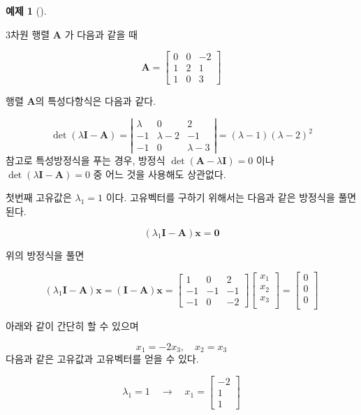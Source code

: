 \documentclass[
  11pt,
  a4paper,
  oneside]{scrbook}
\theoremstyle{definition}
\newtheorem{exercise}{예제}[chapter]
\theoremstyle{plain}
\theoremstyle{definition}
\theoremstyle{definition}
\theoremstyle{remark}
\begin{document}
\begin{exercise}[]\protect\hypertarget{exr-Example-20-1}{}\label{exr-Example-20-1}

3차원 행렬 \(\pmb A\) 가 다음과 같을 때

\[\pmb A=\left[\begin{array}{ccc}0 & 0 & -2 \\ 1 & 2 & 1 \\ 1 & 0 & 3\end{array}\right]\]

행렬 \(\pmb A\)의 특성다항식은 다음과 같다.

\[
\operatorname{det}(\lambda \pmb I -\pmb A)= 
\left|\begin{array}{ccc}
\lambda & 0 & 2 \\
-1 & \lambda-2 & -1 \\
-1 & 0 & \lambda-3
\end{array}\right|=(\lambda-1)(\lambda-2)^2
\] 참고로 특성방정식을 푸는 경우, 방정식
\(\operatorname{det}(\pmb A - \lambda \pmb I)=0\) 이나
\(\operatorname{det}(\lambda \pmb I -\pmb A)= 0\) 중 어느 것을 사용해도
상관없다.

첫번째 고유값은 \(\lambda_1=1\) 이다. 고유벡터를 구하기 위해서는 다음과
같은 방정식을 풀면 된다.

\[ (\lambda_1 \pmb I -\pmb A )\pmb x = \pmb 0  \]

위의 방정식을 풀면

\[
(\lambda_1 \pmb I -\pmb A )\pmb x= (\pmb I -\pmb A )\pmb x
=
\begin{bmatrix}
1 & 0 & 2 \\
-1 & -1 & -1 \\
-1 & 0 & -2
\end{bmatrix}
\begin{bmatrix}
x_1 \\
x_2 \\
x_3 \\
\end{bmatrix}
=
\begin{bmatrix}
0 \\
0 \\
0 \\
\end{bmatrix}
\]

아래와 같이 간단히 할 수 있으며

\[ x_1 = -2x_3, \quad x_2 = x_3 \] 다음과 같은 고유값과 고유벡터를 얻을
수 있다.

\[ \lambda_1=1 \quad \rightarrow \quad  x_1=\begin{bmatrix}-2 \\ 1 \\ 1\end{bmatrix} \]


\end{exercise}
\end{document}
